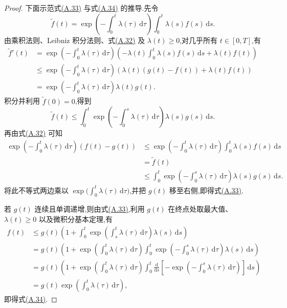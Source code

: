 \begin{proof}
下面示范式\hyperref[eq:appendix-a-33]{(A.33)} 与式\hyperref[eq:appendix-a-34]{(A.34)} 的推导.先令
\[
 \widetilde f(t)=\exp\left(-\int_0^t\lambda(\tau)\,\mathrm d\tau\right)
 \int_0^t\lambda(s)f(s)\,\mathrm ds.
\]
由乘积法则、Leibniz 积分法则、式\hyperref[eq:appendix-a-32]{(A.32)} 及 $\lambda(t)\ge0$,对几乎所有 $t\in[0,T]$,有
\begin{align*}
 \widetilde f'(t)
 &=\exp\left(-\int_0^t\lambda(\tau)\,\mathrm d\tau\right)
 \left(-\lambda(t)\int_0^t\lambda(s)f(s)\,\mathrm ds+\lambda(t)f(t)\right)\\
 &\le\exp\left(-\int_0^t\lambda(\tau)\,\mathrm d\tau\right)
 \left(\lambda(t)(g(t)-f(t))+\lambda(t)f(t)\right)\\
 &=\exp\left(-\int_0^t\lambda(\tau)\,\mathrm d\tau\right)\lambda(t)g(t).
\end{align*}
积分并利用 $\widetilde f(0)=0$,得到
\[
 \widetilde f(t)\le\int_0^t\exp\left(-\int_0^s\lambda(\tau)\,\mathrm d\tau\right)
 \lambda(s)g(s)\,\mathrm ds.
\]
再由式\hyperref[eq:appendix-a-32]{(A.32)} 可知
\begin{align*}
 \exp\left(-\int_0^t\lambda(\tau)\,\mathrm d\tau\right)(f(t)-g(t))
 &\le \exp\left(-\int_0^t\lambda(\tau)\,\mathrm d\tau\right)
 \int_0^t\lambda(s)f(s)\,\mathrm ds\\
 &=\widetilde f(t)\\
 &\le\int_0^t\exp\left(-\int_0^s\lambda(\tau)\,\mathrm d\tau\right)
 \lambda(s)g(s)\,\mathrm ds.
\end{align*}
将此不等式两边乘以 $\exp\bigl(\int_0^t\lambda(\tau)\,\mathrm d\tau\bigr)$,并把 $g(t)$ 移至右侧,即得式\hyperref[eq:appendix-a-33]{(A.33)}.

若 $g(t)$ 连续且单调递增,则由式\hyperref[eq:appendix-a-33]{(A.33)},利用 $g(t)$ 在终点处取最大值、$\lambda(t)\ge0$ 以及微积分基本定理,有
\begin{align*}
 f(t)&\le g(t)\left(1+\int_0^t\exp\left(\int_s^t\lambda(\tau)\,\mathrm d\tau\right)\lambda(s)\,\mathrm ds\right)\\
 &=g(t)\left(1+\exp\left(\int_0^t\lambda(\tau)\,\mathrm d\tau\right)
 \int_0^t\exp\left(-\int_0^s\lambda(\tau)\,\mathrm d\tau\right)\lambda(s)\,\mathrm ds\right)\\
 &=g(t)\left(1+\exp\left(\int_0^t\lambda(\tau)\,\mathrm d\tau\right)
 \int_0^t\frac{\mathrm d}{\mathrm ds}\left[-\exp\left(-\int_0^s\lambda(\tau)\,\mathrm d\tau\right)\right]\,\mathrm ds\right)\\
 &=g(t)\exp\left(\int_0^t\lambda(\tau)\,\mathrm d\tau\right),
\end{align*}
即得式\hyperref[eq:appendix-a-34]{(A.34)}.
\end{proof}

